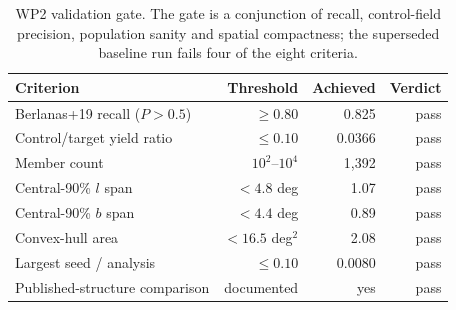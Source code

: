 \begin{table}
\caption{WP2 validation gate. The gate is a conjunction of recall, control-field precision, population sanity and spatial compactness; the superseded baseline run fails four of the eight criteria.}
\label{tab:wp2gate}
\centering
\begin{tabular}{lrrr}
\hline\hline
Criterion & Threshold & Achieved & Verdict \\
\hline
Berlanas+19 recall ($P>0.5$) & $\geq 0.80$ & 0.825 & pass \\
Control/target yield ratio & $\leq 0.10$ & 0.0366 & pass \\
Member count & $10^2$--$10^4$ & 1,392 & pass \\
Central-90\% $l$ span & $< 4.8$ deg & 1.07 & pass \\
Central-90\% $b$ span & $< 4.4$ deg & 0.89 & pass \\
Convex-hull area & $< 16.5$ deg$^2$ & 2.08 & pass \\
Largest seed / analysis & $\leq 0.10$ & 0.0080 & pass \\
Published-structure comparison & documented & yes & pass \\
\hline
\end{tabular}
\end{table}
